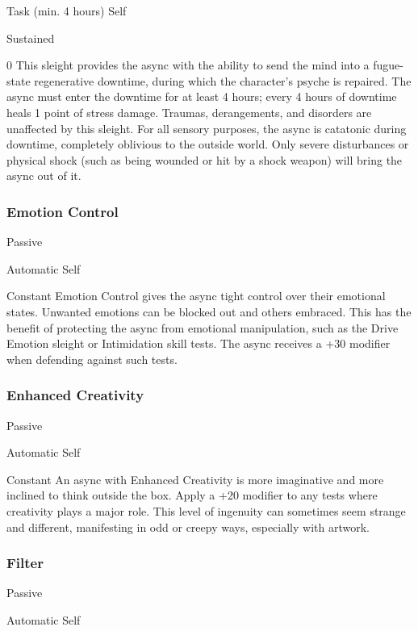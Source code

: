    Task (min. 4 hours)
 Self

   Sustained

   0
This sleight provides the async with the ability 
to send the mind into a fugue-state regenerative 
downtime, during which the character's psyche is 
repaired. The async must enter the downtime for 
at least 4 hours; every 4 hours of downtime heals 
1 point of stress damage. Traumas, derangements, 
and disorders are unaffected by this sleight. For 
all sensory purposes, the async is catatonic during 
downtime, completely oblivious to the outside 
world. Only severe disturbances or physical shock 
(such as being wounded or hit by a shock weapon) 
will bring the async out of it.

\subsubsection{Emotion Control}

  

Passive

   Automatic
 Self

   Constant
Emotion Control gives the async tight control 
over their emotional states. Unwanted emotions 
can be blocked out and others embraced. This has 
the benefit of protecting the async from emotional 
manipulation, such as the Drive Emotion sleight or 
Intimidation skill tests. The async receives a +30 
modifier when defending against such tests.

\subsubsection{Enhanced Creativity}

  

Passive

   Automatic
 Self

   Constant
An async with Enhanced Creativity is more imaginative
and more inclined to think outside the box.
Apply a +20 modifier to any tests where creativity
plays a major role. This level of ingenuity can
sometimes seem strange and different, manifesting 
in odd or creepy ways, especially with artwork.

\subsubsection{Filter}

  

Passive

   Automatic
 Self

